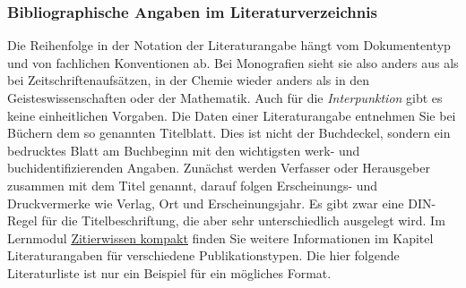 \documentclass[a4paper,11pt]{article}%
\renewcommand{\\}{\vspace*{0.5\baselineskip} \newline}
\begin{document}
\subsubsection{Bibliographische Angaben im Literaturverzeichnis}
Die Reihenfolge in der Notation der Literaturangabe hängt vom Dokumententyp und von fachlichen Konventionen ab. Bei Monografien sieht sie also anders aus als bei Zeitschriftenaufsätzen, in der Chemie wieder anders als in den Geisteswissenschaften oder der Mathematik. Auch für die \textit{Interpunktion} gibt es keine einheitlichen Vorgaben.\\ 
Die Daten einer Literaturangabe entnehmen Sie bei Büchern dem so genannten Titelblatt. Dies ist nicht der Buchdeckel, sondern ein bedrucktes Blatt am Buchbeginn mit den wichtigsten werk- und buchidentifizierenden Angaben. Zunächst werden Verfasser oder Herausgeber zusammen mit dem Titel genannt, darauf folgen Erscheinungs- und Druckvermerke wie Verlag, Ort und Erscheinungsjahr. Es gibt zwar eine DIN-Regel für die Titelbeschriftung, die aber sehr unterschiedlich ausgelegt wird.\\
Im Lernmodul \href{https://ilias.th-koeln.de/ilias.php?baseClass=ilRepositoryGUI}{\underline{Zitierwissen kompakt}} finden Sie weitere Informationen im Kapitel Literaturangaben für verschiedene Publikationstypen. Die hier folgende Literaturliste ist nur ein Beispiel für ein mögliches Format.
\newpage
\end{document}
